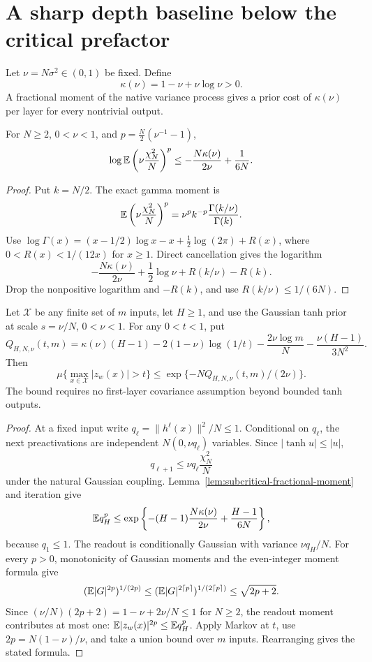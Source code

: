 \section{A sharp depth baseline below the critical prefactor}
\label{sec:subcritical-prefactor-floor}
Let $\nu=N\sigma^2\in(0,1)$ be fixed. Define
\[
 \kappa(\nu)=1-\nu+\nu\log\nu>0.
\]
A fractional moment of the native variance process gives a prior cost of $\kappa(\nu)$ per layer for every nontrivial output.

\begin{lemma}
\label{lem:subcritical-fractional-moment}
For $N\ge2$, $0<\nu<1$, and $p=\tfrac N2(\nu^{-1}-1)$,
\[
 \log\mathbb E\left(\nu\frac{\chi_N^2}{N}\right)^p
 \le-\frac{N\kappa(\nu)}{2\nu}+\frac1{6N}.
\]
\end{lemma}
\begin{proof}
Put $k=N/2$. The exact gamma moment is
\[
 \mathbb E\left(\nu\frac{\chi_N^2}{N}\right)^p
 =\nu^p k^{-p}\frac{\Gamma(k/\nu)}{\Gamma(k)}.
\]
Use $\log\Gamma(x)=(x-1/2)\log x-x+\tfrac12\log(2\pi)+R(x)$, where $0<R(x)<1/(12x)$ for $x\ge1$. Direct cancellation gives the logarithm
\[
 -\frac{N\kappa(\nu)}{2\nu}+\frac12\log\nu
              +R(k/\nu)-R(k).
\]
Drop the nonpositive logarithm and $-R(k)$, and use $R(k/\nu)\le1/(6N)$.
\end{proof}

\begin{lemma}
\label{lem:subcritical-event-cost}
Let $\mathcal X$ be any finite set of $m$ inputs, let $H\ge1$, and use the Gaussian tanh prior at scale $s=\nu/N$, $0<\nu<1$. For any $0<t<1$, put
\[
 Q_{H,N,\nu}(t,m)=\kappa(\nu)(H-1)
 -2(1-\nu)\log(1/t)-\frac{2\nu\log m}{N}
 -\frac{\nu(H-1)}{3N^2}.
\]
Then
\[
 \mu\{\max_{x\in\mathcal X}|z_w(x)|>t\}
 \le\exp\{-NQ_{H,N,\nu}(t,m)/(2\nu)\}.
\]
The bound requires no first-layer covariance assumption beyond bounded tanh outputs.
\end{lemma}
\begin{proof}
At a fixed input write $q_\ell=\|h^\ell(x)\|^2/N\le1$. Conditional on $q_\ell$, the next preactivations are independent $N(0,\nu q_\ell)$ variables. Since $|\tanh u|\le|u|$,
\[
 q_{\ell+1}\le\nu q_\ell\frac{\chi_N^2}{N}
\]
under the natural Gaussian coupling. Lemma~\ref{lem:subcritical-fractional-moment} and iteration give
\[
 \mathbb E q_H^p\le\exp\left\{-(H-1)\frac{N\kappa(\nu)}{2\nu}
                                      +\frac{H-1}{6N}\right\},
\]
because $q_1\le1$.
The readout is conditionally Gaussian with variance $\nu q_H/N$. For every $p>0$, monotonicity of Gaussian moments and the even-integer moment formula give
\[
 (\mathbb E|G|^{2p})^{1/(2p)}
 \le(\mathbb E|G|^{2\lceil p\rceil})^{1/(2\lceil p\rceil)}
 \le\sqrt{2p+2}.
\]
Since $(\nu/N)(2p+2)=1-\nu+2\nu/N\le1$ for $N\ge2$, the readout moment contributes at most one:
$\mathbb E|z_w(x)|^{2p}\le\mathbb E q_H^p$.
Apply Markov at $t$, use $2p=N(1-\nu)/\nu$, and take a union bound over $m$ inputs. Rearranging gives the stated formula.
\end{proof}

